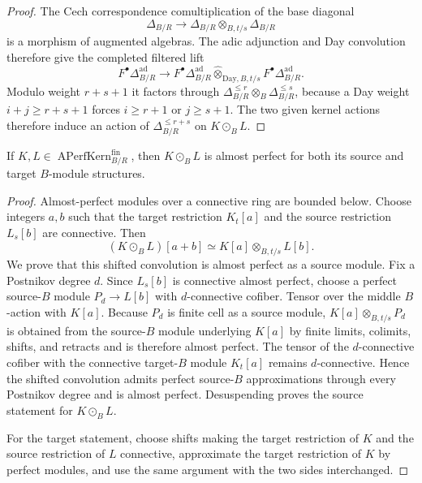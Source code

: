 \begin{proof}
The Cech correspondence comultiplication of the base diagonal
\[
    \Delta_{B/R}
    \longrightarrow
    \Delta_{B/R}\otimes_{B,t/s}\Delta_{B/R}
\]
is a morphism of augmented algebras.  The adic adjunction and Day convolution
therefore give the completed filtered lift
\[
    F^\bullet\Delta_{B/R}^{\mathrm{ad}}
    \longrightarrow
    F^\bullet\Delta_{B/R}^{\mathrm{ad}}
    \widehat\otimes_{\mathrm{Day},B,t/s}
    F^\bullet\Delta_{B/R}^{\mathrm{ad}}.
\]
Modulo weight $r+s+1$ it factors through
$\Delta_{B/R}^{\leq r}\otimes_B\Delta_{B/R}^{\leq s}$, because a Day weight
$i+j\geq r+s+1$ forces $i\geq r+1$ or $j\geq s+1$.  The two given kernel
actions therefore induce an action of $\Delta_{B/R}^{\leq r+s}$ on
$K\odot_BL$.
\end{proof}

\begin{lemma}
\label{lem:as-kernel-aperf-convolution}
If $K,L\in\operatorname{APerfKern}^{\mathrm{fin}}_{B/R}$, then
$K\odot_BL$ is almost perfect for both its source and target $B$-module
structures.
\end{lemma}

\begin{proof}
Almost-perfect modules over a connective ring are bounded below.  Choose
integers $a,b$ such that the target restriction $K_t[a]$ and the source
restriction $L_s[b]$ are connective.  Then
\[
    (K\odot_BL)[a+b]
    \simeq
    K[a]\otimes_{B,t/s}L[b].
\]
We prove that this shifted convolution is almost perfect as a source module.
Fix a Postnikov degree $d$.  Since $L_s[b]$ is connective almost perfect,
choose a perfect source-$B$ module $P_d\to L[b]$ with $d$-connective cofiber.
Tensor over the middle $B$-action with $K[a]$.  Because $P_d$ is finite cell
as a source module,
$K[a]\otimes_{B,t/s}P_d$ is obtained from the source-$B$ module underlying
$K[a]$ by finite limits, colimits, shifts, and retracts and is therefore
almost perfect.  The tensor of the $d$-connective cofiber with the connective
target-$B$ module $K_t[a]$ remains $d$-connective.  Hence the shifted
convolution admits perfect source-$B$ approximations through every Postnikov
degree and is almost perfect.  Desuspending proves the source statement for
$K\odot_BL$.

For the target statement, choose shifts making the target restriction of $K$
and the source restriction of $L$ connective, approximate the target
restriction of $K$ by perfect modules, and use the same argument with the two
sides interchanged.
\end{proof}

